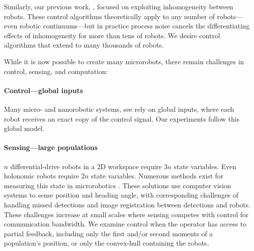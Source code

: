 Similarly, our previous work, \cite{Becker2012,Becker2012k}, focused on exploiting inhomogeneity between robots.  These control algorithms theoretically apply to any number of robots---even robotic continuums---but in practice process noise cancels the differentiating effects of inhomogeneity for more than tens of robots.  We desire control algorithms that extend to many thousands of robots.

 While it is now possible to create many microrobots, there remain challenges in control, sensing, and computation:
  
 \paragraph{Control---global inputs}
 Many micro- and nanorobotic systems, see \cite{Tottori2012,Shirai2005,Chiang2011,Donald2006,Donald2008,Takahashi2006,Floyd2011,Diller2013,Frutiger2008,Peyer2013}
   rely on global inputs, where each robot receives an exact copy of the control signal.  Our experiments follow this global model.
  
 \paragraph{Sensing---large populations}
$n$ differential-drive robots in a 2D workspace require $3n$ state variables. Even holonomic robots require $2n$ state variables. Numerous methods exist for measuring this state in microrobotics \cite{Peyer2013,Chiang2011,martel2014computer}.  These solutions use computer vision systems to sense position and heading angle, with corresponding challenges of handling missed detections and image registration between detections and robots.  These challenges increase at small scales where sensing competes with control for communication bandwidth.   We examine control when the operator has access to partial feedback, including only the first and/or second moments of a population's position, or only the convex-hull containing the robots.
 
